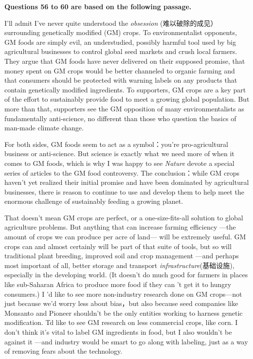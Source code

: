 \documentclass[UTF8,11pt]{ctexart}
\begin{document}
\textbf{Questions 56 to 60 are based on the following passage.}


I’ll admit I’ve never quite understood the\textit{ obsession} (难以破除的成见）surrounding genetically modified (GM) crops. To environmentalist opponents, GM foods are simply evil, an understudied, possibly harmful tool used by big agricultural businesses to control global seed markets and crush local farmers. They argue that GM foods have never delivered on their supposed promise, that money spent on GM crops would be better channeled to organic farming and that consumers should be protected with warning labels on any products that contain genetically modified ingredients. To supporters, GM crops are a key part of the effort to sustainably provide food to meet a growing global population. But more than that, supporters see the GM opposition of many environmentalists as fundamentally anti-science, no different than those who question the basics of man-made climate change.


For both sides, GM foods seem to act as a symbol：you’re pro-agricultural business or anti-science. But science is exactly what we need more of when it comes to GM foods, which is why I was happy to see\textit{ Nature} devote a special series of articles to the GM food controversy. The conclusion：while GM crops haven’t yet realized their initial promise and have been dominated by agricultural businesses, there is reason to continue to use and develop them to help meet the enormous challenge of sustainably feeding a growing planet.


That doesn’t mean GM crops are perfect, or a one-size-fits-all solution to global agriculture problems. But anything that can increase farming efficiency —the amount of crops we can produce per acre of land— will be extremely useful. GM crops can and almost certainly will be part of that suite of tools, but so will traditional plant breeding, improved soil and crop management —and perhaps most important of all, better storage and transport\textit{ infrastructure}(基础设施), especially in the developing world. (It doesn’t do much good for farmers in places like sub-Saharan Africa to produce more food if they can 't get it to hungry consumers.) I 'd like to see more non-industry research done on GM crops—not just because we’d worry less about bias，but also because seed companies like Monsanto and Pioneer shouldn’t be the only entities working to harness genetic modification. Td like to see GM research on less commercial crops, like corn. I don’t think it’s vital to label GM ingredients in food, but I also wouldn’t be against it —and industry would be smart to go along with labeling, just as a way of removing fears about the technology.
\end{document}
